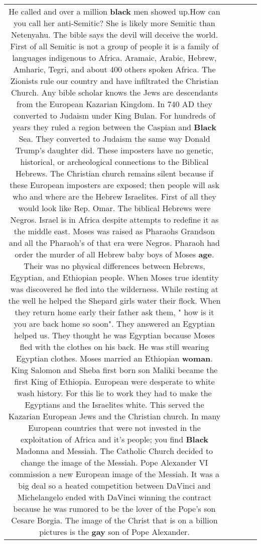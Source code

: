 \documentclass[11pt]{article}
\newlength\mylength
\begin{document}
\begin{center}
\begin{longtable}{|C{.65\mylength}|C{.30\mylength}|C{.12\mylength}|C{.12\mylength}|C{.12\mylength}|}
  \small He called and over a million \textbf{black} men showed up.How can you call her anti-Semitic? She is likely more Semitic than Netenyahu. The bible says the devil will deceive the world. First of all Semitic is not a group of people it is a family of languages indigenous to Africa. Aramaic, Arabic, Hebrew, Amharic, Tegri, and about 400 others spoken Africa.
The Zionists rule our country and have infiltrated the Christian Church. Any bible scholar knows the Jews are descendants from the European Kazarian Kingdom. In 740 AD they converted to Judaism under King Bulan. For hundreds of years they ruled a region between the Caspian and \textbf{Black} Sea. They converted to Judaism the same way Donald Trump's daughter did. These imposters have no genetic, historical, or archeological connections to the Biblical Hebrews. 
The Christian church remains silent because if these European imposters are exposed; then people will ask who and where are the Hebrew Israelites.
First of all they would look like Rep. Omar. The biblical Hebrews were Negros. Israel is in Africa despite attempts to redefine it as the middle east. 
Moses was raised as Pharaohs Grandson and all the Pharaoh's of that era were Negros. Pharaoh had order the murder of all Hebrew baby boys of Moses \textbf{age}. Their was no physical differences between Hebrews, Egyptian, and Ethiopian people. When Moses true identity was discovered he fled into the wilderness. While resting at the well he helped the Shepard girls water their flock. When they return home early their father ask them, " how is it you are back home so soon". They answered an Egyptian helped us. They thought he was Egyptian because Moses fled with the clothes on his back. He was still wearing Egyptian clothes. Moses married an Ethiopian \textbf{woman}. King Salomon and Sheba first born son Maliki became the first King of Ethiopia. 
European were desperate to white wash history. For this lie to work they had to make the Egyptians and the Israelites white. This served the Kazarian European Jews and the Christian church. In many European countries that were not invested in the exploitation of Africa and it's people; you find \textbf{Black} Madonna and Messiah.
The Catholic Church decided to change the image of the Messiah. Pope Alexander VI commission a new European image of the Messiah. It was a big deal so a heated competition between DaVinci and Michelangelo ended with DaVinci winning the contract because he was rumored to be the lover of the Pope's son Cesare Borgia. The image of the Christ that is on a billion pictures is the \textbf{g\textbf{ay}} son of Pope Alexander. 

\end{longtable}
\end{center}
\end{document}
